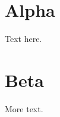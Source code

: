 \documentclass{amsldoc}
\begin{document}
\tableofcontents
\section{Alpha}
Text  here.
\section{Beta}
More  text.
\end{document}
